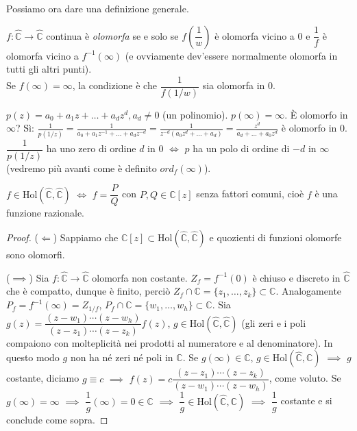 Possiamo ora dare una definizione generale.

\begin{defn}
  $f:\hat{\mathbb{C}} \rightarrow \hat{\mathbb{C}}$ continua è \textit{olomorfa} se e solo se $f\left(\dfrac{1}{w}\right)$ è olomorfa vicino a $0$ e $\dfrac{1}{f}$ è olomorfa vicino a $f^{-1}(\infty)$ (e ovviamente dev'essere normalmente olomorfa in tutti gli altri punti). \\
  Se $f(\infty)=\infty$, la condizione è che $\dfrac{1}{f(1/w)}$ sia olomorfa in $0$.
\end{defn}

\begin{ex}
  $p(z)=a_0+a_1z+\dots+a_dz^d, a_d \not=0$ (un polinomio). $p(\infty)=\infty$. È olomorfo in $\infty$? Sì: $\displaystyle \frac{1}{p(1/z)}=\frac{1}{a_0+a_1z^{-1}+\dots+a_dz^{-d}}=\frac{1}{z^{-d}(a_0z^d+\dots+a_d)}=\frac{z^d}{a_d+\dots+a_0z^d}$ è olomorfo in $0$.
  $\dfrac{1}{p(1/z)}$ ha uno zero di ordine $d$ in $0$ $\iff$ $p$ ha un polo di ordine di $-d$ in $\infty$ (vedremo più avanti come è definito $ord_f(\infty)$).
\end{ex}

\begin{prop}
  $f \in \text{Hol}(\hat{\mathbb{C}}, \hat{\mathbb{C}})$ $\iff$ $f=\dfrac{P}{Q}$ con $P, Q \in \mathbb{C}[z]$ senza fattori comuni, cioè $f$ è una funzione razionale.
\end{prop}

\begin{proof}
  ($\Leftarrow$) Sappiamo che $\mathbb{C}[z] \subset \text{Hol}(\hat{\mathbb{C}}, \hat{\mathbb{C}})$ e quozienti di funzioni olomorfe sono olomorfi.

  ($\implies$) Sia $f: \hat{\mathbb{C}} \rightarrow \hat{\mathbb{C}}$ olomorfa non costante. $Z_f=f^{-1}(0)$ è chiuso e discreto in $\hat{\mathbb{C}}$ che è compatto, dunque è finito, perciò $Z_f \cap \mathbb{C}=\{z_1, \dots, z_k\} \subset \mathbb{C}$.
  Analogamente $P_f=f^{-1}(\infty)=Z_{1/f}$, $P_f \cap \mathbb{C}=\{w_1, \dots, w_h\} \subset \mathbb{C}$. Sia $g(z)=\dfrac{(z-w_1)\cdots(z-w_h)}{(z-z_1) \cdots (z-z_k)}f(z)$, $g \in \text{Hol}(\hat{\mathbb{C}}, \hat{\mathbb{C}})$ (gli zeri e i poli compaiono con molteplicità nei prodotti al numeratore e al denominatore).
  In questo modo $g$ non ha né zeri né poli in $\mathbb{C}$. Se $g(\infty) \in \mathbb{C}$, $g \in \text{Hol}(\hat{\mathbb{C}}, \mathbb{C})$ $\implies$ $g$ costante, diciamo $g \equiv c$ $\implies$ $f(z)=c\dfrac{(z-z_1) \cdots (z-z_k)}{(z-w_1)\cdots(z-w_h)}$, come voluto.
  Se $g(\infty)=\infty$ $\implies$ $\dfrac{1}{g}(\infty)=0 \in \mathbb{C}$ $\implies$ $\dfrac{1}{g} \in \text{Hol}(\hat{\mathbb{C}}, \mathbb{C})$ $\implies$ $\dfrac{1}{g}$ costante e si conclude come sopra.
\end{proof}

